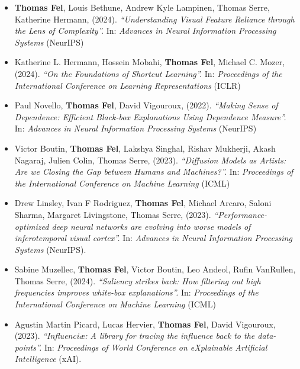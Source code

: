 \begin{itemize}
    \item \textbf{Thomas Fel}\equal, Louis Bethune\equal, Andrew Kyle Lampinen, Thomas Serre, Katherine Hermann, (2024). \textit{``Understanding Visual Feature Reliance through the Lens of Complexity''.} In: \textit{Advances in Neural Information Processing Systems} (\textcolor{confcolor}{NeurIPS})

    \item Katherine L. Hermann, Hossein Mobahi, \textbf{Thomas Fel}, Michael C. Mozer, (2024). \textit{``On the Foundations of Shortcut Learning''.} In: \textit{Proceedings of the International Conference on Learning Representations} (\textcolor{confcolor}{ICLR})


    \item Paul Novello, \textbf{Thomas Fel}, David Vigouroux, (2022). \textit{``Making Sense of Dependence: Efficient Black-box Explanations Using Dependence Measure''.} In: \textit{Advances in Neural Information Processing Systems} (\textcolor{confcolor}{NeurIPS})

    \item Victor Boutin, \textbf{Thomas Fel}, Lakshya Singhal, Rishav Mukherji, Akash Nagaraj, Julien Colin, Thomas Serre, (2023). \textit{``Diffusion Models as Artists: Are we Closing the Gap between Humans and Machines?''.} In: \textit{Proceedings of the International Conference on Machine Learning} (\textcolor{confcolor}{ICML})

    \item Drew Linsley, Ivan F Rodriguez, \textbf{Thomas Fel}, Michael Arcaro, Saloni Sharma, Margaret Livingstone, Thomas Serre, (2023). \textit{``Performance-optimized deep neural networks are evolving into worse models of inferotemporal visual cortex''.} In: \textit{Advances in Neural Information Processing Systems} (\textcolor{confcolor}{NeurIPS}).

    \item Sabine Muzellec, \textbf{Thomas Fel}, Victor Boutin, Leo Andeol, Rufin VanRullen, Thomas Serre, (2024). \textit{``Saliency strikes back: How filtering out high frequencies improves white-box explanations''.} In: \textit{Proceedings of the International Conference on Machine Learning} (\textcolor{confcolor}{ICML})

    \item Agustin Martin Picard, Lucas Hervier, \textbf{Thomas Fel}, David Vigouroux, (2023). \textit{``Influenci{\ae}: A library for tracing the influence back to the data-points''.} In: \textit{Proceedings of World Conference on eXplainable Artificial Intelligence} (\textcolor{confcolor}{xAI}).


\end{itemize}
